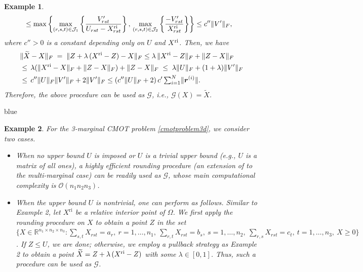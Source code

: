 \documentclass[10pt]{article}
\newcommand{\blue}[1]{\begin{color}{blue}#1\end{color}}
\newtheorem{example}{Example}
\begin{document}
\begin{example}
\begin{equation*}
\begin{aligned}
&\leq \max\left\{ \max\limits_{(r,s,t)\in\mathcal{J}_1}\left\{\frac{V'_{rst}}{U_{rst}-X^{\rm ri}_{rst}}\right\},\,\max\limits_{(r,s,t)\in\mathcal{J}_2}\left\{\frac{-V'_{rst}}{X^{\rm ri}_{rst}}\right\}\right\}
\leq c''\|V'\|_F,
\end{aligned}
\end{equation*}
where $c''>0$ is a constant  depending only on $U$ and $X^{\rm ri}$. Then, we have
\begin{equation*}
\begin{aligned}
&\|\widetilde{X}-X\|_F  \;=\; \|Z+\lambda\,(X^{\rm ri}-Z)-X\|_F
\leq \lambda\,\|X^{\rm ri}-Z\|_F + \|Z-X\|_F \\
&\leq \, \lambda (\|X^{\rm ri}-X\|_F + \|Z-X\|_F) +  \|Z-X\|_F
\;\leq\; \lambda \|U\|_F + (1+\lambda)\|V'\|_F
\\
&\leq \,c''\|U\|_F\|V'\|_F + 2 \|V'\|_F \leq (c''\|U\|_F+2)\,c'\,{\textstyle\sum^N_{i=1}}\|\bm{r}^{(i)}\|.
\end{aligned}
\end{equation*}
Therefore, the above procedure can be used as $\mathcal{G}$, i.e., $\mathcal{G}(X) = \widetilde{X}$.
\end{example}

\blue{
\begin{example}
For the 3-marginal CMOT problem \eqref{cmotproblem3d}, we consider two cases.
\begin{itemize}[leftmargin=0.5cm]
\item When no upper bound $U$ is imposed \textit{or} $U$ is a trivial upper bound (e.g., $U$ is a matrix of all ones), a highly efficient rounding procedure \cite[Algorithm 2]{lin2022on} (an extension of
    \cite[Algorithm 2]{awr2017near} to the multi-marginal case) can be readily used as $\mathcal{G}$, whose main computational complexity is $\mathcal{O}(n_1 n_2 n_3)$.

\item When the upper bound $U$ is nontrivial, one can perform as follows. Similar to Example 2, let $X^{\mathrm{ri}}$ be a relative interior point of $\Omega$. We first apply the rounding procedure
    \cite[Algorithm 2]{lin2022on} on $X$ to obtain a point $Z$ in the set $\big\{X\in\mathbb{R}^{n_1 \times n_2 \times n_3}: \sum_{s,t}X_{rst} = a_r, ~r = 1, \dots, n_1, ~\sum_{r,t}X_{rst} = b_s, ~s = 1, \dots, n_2, ~\sum_{r,s}X_{rst} = c_t, ~t = 1, \dots, n_3, ~X\geq0\big\}$. If $Z \leq U$, we are done; otherwise, we employ a pullback strategy as Example 2 to obtain a point $\widetilde{X}=Z+\lambda\,(X^{\rm ri}-Z)$ with some $\lambda \in[0,1]$. Thus, such a procedure can be used as $\mathcal{G}$.
\end{itemize}
\end{example}
}
\end{document}
